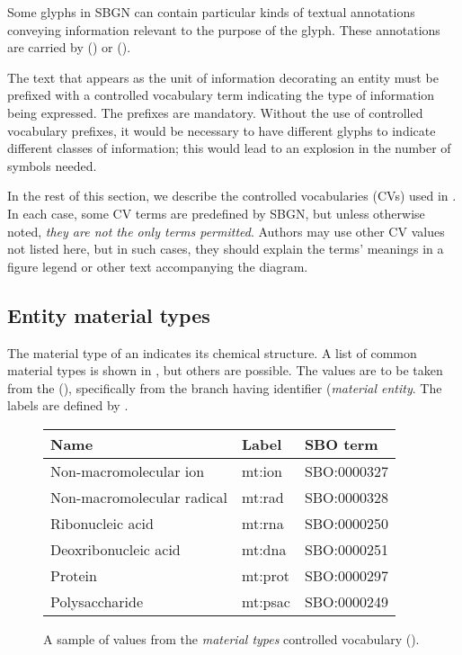 \color{blue}

Some glyphs in SBGN \ERs can contain particular kinds of textual annotations conveying information relevant to the purpose of the glyph.  These annotations are carried by  () or  ().

The text that appears as the unit of information decorating an entity must be prefixed with a controlled vocabulary term indicating the type of information being expressed.  The prefixes are mandatory.  Without the use of controlled vocabulary prefixes, it would be necessary to have different glyphs to indicate different classes of information; this would lead to an explosion in the number of symbols needed.

In the rest of this section, we describe the controlled vocabularies (CVs) used in \SBGNERLone.  In each case, some CV terms are predefined by SBGN, but unless otherwise noted, \emph{they are not the only terms permitted}.  Authors may use other CV values not listed here, but in such cases, they should explain the terms' meanings in a figure legend or other text accompanying the diagram.

\subsection{Entity material types}
\label{sec:material-types-cv}

The material type of an  indicates its chemical structure.  A list of common material types is shown in , but others are possible.  The values are to be taken from the \sbo (\sbourl), specifically from the branch having identifier  (\emph{material entity}.  The labels are defined by \SBGNERLone.

\begin{figure}[h]
  \centering
  \begin{tabular}{l>{\ttfamily}ll}
    \toprule
    \textbf{Name}              & \textbf{\rmfamily Label} & \textbf{SBO term} \\
    \midrule
    Non-macromolecular ion     & mt:ion  & SBO:0000327\\
    Non-macromolecular radical & mt:rad  & SBO:0000328\\
    Ribonucleic acid           & mt:rna  & SBO:0000250\\
    Deoxribonucleic acid       & mt:dna  & SBO:0000251\\
    Protein                    & mt:prot & SBO:0000297\\
    Polysaccharide             & mt:psac & SBO:0000249\\
    \bottomrule
  \end{tabular}
  \caption{A sample of values from the \emph{material types} controlled
    vocabulary ().}
  \label{fig:material-types-cv}
\end{figure}

